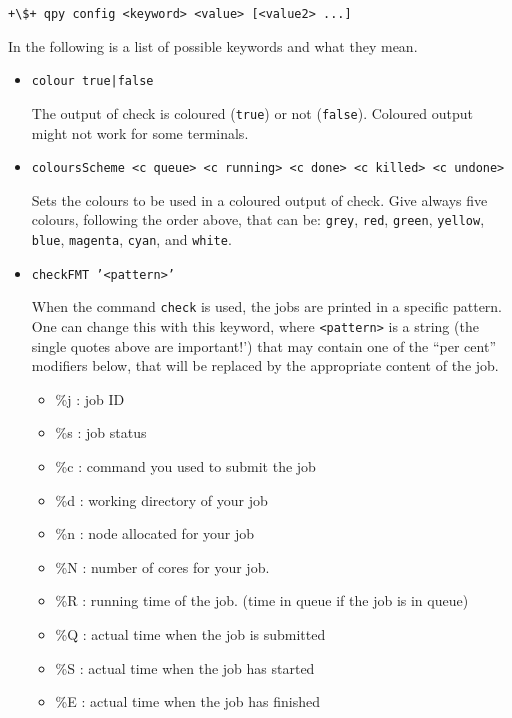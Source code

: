 \documentclass[a4paper,12pt]{article}
\begin{document}
\begin{lstlisting}[style=BashStyle]
+\$+ qpy config <keyword> <value> [<value2> ...]
\end{lstlisting}

In the following is a list of possible keywords and what they mean.

\begin{itemize}
\item \texttt{colour true|false}
  
  The output of check is coloured (\texttt{true}) or not (\texttt{false}).
  Coloured output might not work for some terminals.

\item \texttt{coloursScheme <c queue> <c running> <c done> <c killed> <c undone>}

  Sets the colours to be used in a coloured output of check.
  Give always five colours, following the order above, that can be:
  \texttt{grey}, \texttt{red}, \texttt{green}, \texttt{yellow}, \texttt{blue}, \texttt{magenta}, \texttt{cyan}, and \texttt{white}.

\item \texttt{checkFMT '<pattern>'}

  When the command \texttt{check} is used, the jobs are printed in a specific pattern.
  One can change this with this keyword, where \texttt{<pattern>} is a string (the single quotes above are important!') that may contain one of the ``per cent'' modifiers below, that will be replaced by the appropriate content of the job.

  \begin{itemize}
  \item \%j : job ID
  \item \%s : job status
  \item \%c : command you used to submit the job
  \item \%d : working directory of your job
  \item \%n : node allocated for your job
  \item \%N : number of cores for your job.
  \item \%R : running time of the job. (time in queue if the job is in queue)
  \item \%Q : actual time when the job is submitted
  \item \%S : actual time when the job has started
  \item \%E : actual time when the job has finished
  \end{itemize}


\end{itemize}
\end{document}
